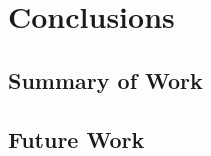 \section{Conclusions}%
\label{sec:Res2_conclusions}



\subsection{Summary of Work}%
\label{sec:Res2_summary}



\subsection{Future Work}%
\label{sec:Res2_future}


